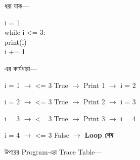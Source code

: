 
ধরা যাক—

\begin{codebox}
\begin{english}
\ttfamily
i = 1\\[0.5mm]
while i <= 3:\\
\hspace*{4mm}print(i)\\
\hspace*{4mm}i += 1
\end{english}
\end{codebox}

এর কার্যধারা—

\begin{center}

\textenglish{\ttfamily i = 1}
\(\longrightarrow\)
\textenglish{ <= 3}
True
\(\longrightarrow\)
Print 1
\(\longrightarrow\)
\textenglish{\ttfamily i = 2}

\medskip

\textenglish{\ttfamily i = 2}
\(\longrightarrow\)
\textenglish{ <= 3}
True
\(\longrightarrow\)
Print 2
\(\longrightarrow\)
\textenglish{\ttfamily i = 3}

\medskip

\textenglish{\ttfamily i = 3}
\(\longrightarrow\)
\textenglish{ <= 3}
True
\(\longrightarrow\)
Print 3
\(\longrightarrow\)
\textenglish{\ttfamily i = 4}

\medskip

\textenglish{\ttfamily i = 4}
\(\longrightarrow\)
\textenglish{ <= 3}
False
\(\longrightarrow\)
\textbf{Loop শেষ}

\end{center}



উপরের Program-এর Trace Table—

